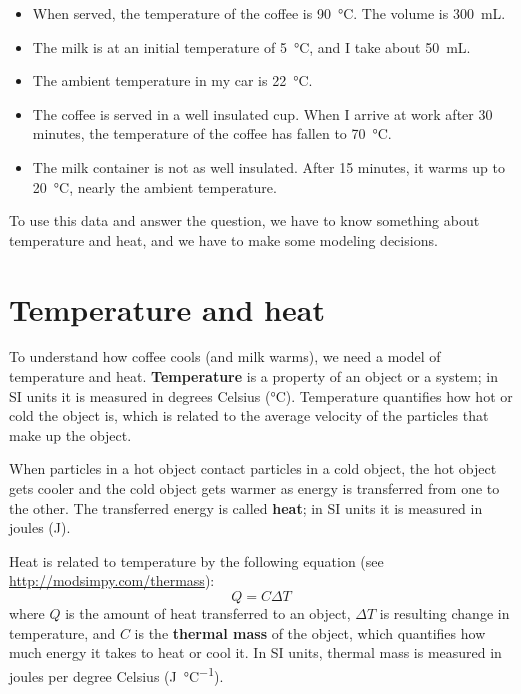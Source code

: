 \documentclass[12pt]{book}
\theoremstyle{exercise}
\begin{document}
\begin{itemize}

\item When served, the temperature of the coffee is \SI{90}{\celsius}.  The volume is \SI{300}{mL}.

\item The milk is at an initial temperature of \SI{5}{\celsius}, and I take about \SI{50}{mL}.

\item The ambient temperature in my car is \SI{22}{\celsius}.

\item The coffee is served in a well insulated cup.  When I arrive at work after 30 minutes, the temperature of the coffee has fallen to \SI{70}{\celsius}.

\item The milk container is not as well insulated.  After 15 minutes, it warms up to \SI{20}{\celsius}, nearly the ambient temperature.

\end{itemize}

To use this data and answer the question, we have to know something about temperature and heat, and we have to make some modeling decisions.


\section{Temperature and heat}

To understand how coffee cools (and milk warms), we need a model of temperature and heat.  {\bf Temperature} is a property of an object or a system; in SI units it is measured in degrees Celsius (\si{\celsius}).  Temperature quantifies how hot or cold the object is, which is related to the average velocity of the particles that make up the object.


When particles in a hot object contact particles in a cold object, the hot object gets cooler and the cold object gets warmer as energy is transferred from one to the other.  The transferred energy is called {\bf heat}; in SI units it is measured in joules (\si{\joule}).


Heat is related to temperature by the following equation (see \url{http://modsimpy.com/thermass}):
%
\[ Q = C \Delta T \]
%
where $Q$ is the amount of heat transferred to an object, $\Delta T$ is resulting change in temperature, and $C$ is the {\bf thermal mass} of the object, which quantifies how much energy it takes to heat or cool it.  In SI units, thermal mass is measured in joules per degree Celsius (\si{\joule\per\celsius}).
\end{document}
